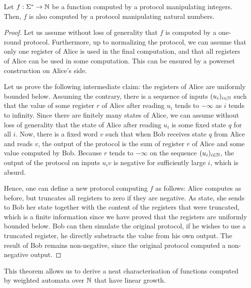 \begin{theorem}
  \label{thm:string-to-number-protocols-nat}
  Let $f : \Sigma^* \to {\mathbb N}$ be a function computed by a protocol
  manipulating integers. Then, $f$ is also computed by a protocol
  manipulating natural numbers.
\end{theorem}
\begin{proof}
  Let us assume without loss of generality that $f$ is computed by a one-round
  protocol. Furthermore, up to normalizing the protocol, we can assume that only one
  register of Alice is used in the final computation, and that all registers of
  Alice can be used in some computation. This can be ensured by a powerset
  construction on Alice's side.

  Let us prove the following intermediate claim: the registers of Alice are
  uniformly bounded below. Assuming the contrary, there is a sequence of inputs
  $(u_i)_{i \in {\mathbb N}}$ such that the value of some register $r$ of Alice after
  reading $u_i$ tends to $-\infty$ as $i$ tends to infinity. Since there are
  finitely many states of Alice, we can assume without loss of generality that
  the state of Alice after reading $u_i$ is some fixed state $q$ for all $i$.
  Now, there is a fixed word $v$ such that when Bob receives state $q$ from
  Alice and reads $v$, the output of the protocol is the sum of register $r$ of
  Alice and some value computed by Bob. Because $r$ tends to $-\infty$ on the
  sequence $(u_i)_{i \in {\mathbb N}}$, the output of the protocol on inputs $u_i v$
  is negative for sufficiently large $i$, which is absurd.


  Hence, one can define a new protocol computing $f$ as follows: Alice
  computes as before, but truncates all registers to zero if they are
  negative. As state, she sends to Bob her state together with the content of
  the registers that were truncated, which is a finite information since we
  have proved that the registers are uniformly bounded below. Bob can then
  simulate the original protocol, if he wishes to use a truncated register,
  he directly substracts the value from his own output. The result of Bob
  remains non-negative, since the original protocol computed a non-negative
  output.
\end{proof}

This theorem allows us to derive a neat characterisation of functions 
computed by weighted automata over ${\mathbb N}$ that have linear growth.

